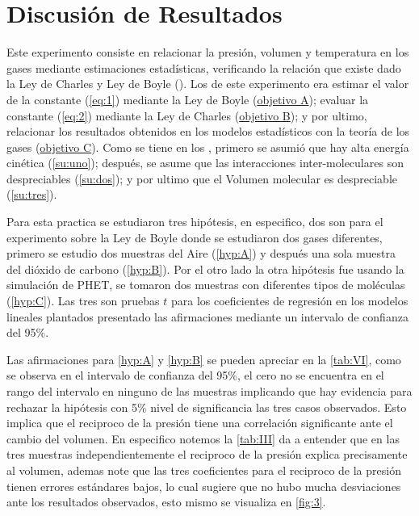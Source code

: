 \documentclass[12pt,a4paper]{config/myConfig}
\begin{document}
\section{Discusión de Resultados}
\label{sec:DISCUSSION}

Este experimento consiste en relacionar la presión, volumen y temperatura en los gases mediante estimaciones estadísticas, verificando la relación que existe dado la Ley de Charles y Ley de Boyle (\cite{physicsTextbook}).  Los de este experimento era estimar el valor de la constante (\cref{eq:1}) mediante la Ley de Boyle (\hyperref[obj:A]{objetivo A}); evaluar la constante (\cref{eq:2}) mediante la Ley de Charles (\hyperref[obj:B]{objetivo B}); y por ultimo, relacionar los resultados obtenidos en los modelos estadísticos con la teoría de los gases  (\hyperref[obj:C]{objetivo C}). Como se tiene en los , primero se asumió que hay alta energía cinética (\cref{su:uno}); después, se asume que las interacciones inter-moleculares son despreciables (\cref{su:dos}); y por ultimo que el Volumen molecular es despreciable (\cref{su:tres}).\newline 

Para esta practica se estudiaron tres hipótesis, en especifico, dos son para el experimento sobre la Ley de Boyle donde se estudiaron dos gases diferentes, primero se estudio dos muestras del Aire (\cref{hyp:A}) y después una sola muestra del dióxido de carbono (\cref{hyp:B}). Por el otro lado la otra hipótesis fue usando la simulación de PHET, se tomaron dos muestras con diferentes tipos de moléculas (\cref{hyp:C}). Las tres  son pruebas $t$ para los coeficientes de regresión en los modelos lineales plantados presentado las afirmaciones mediante un intervalo de confianza del 95\%. \newline    

Las afirmaciones para \cref{hyp:A} y \cref{hyp:B} se pueden apreciar en la \cref{tab:VI}, como se observa en el intervalo de confianza del 95\%, el cero no se encuentra en el rango del intervalo en ninguno de las muestras implicando que hay evidencia para rechazar la hipótesis con 5\% nivel de significancia las tres casos observados. Esto implica que el reciproco de la presión tiene una correlación significante ante el cambio del volumen. En especifico notemos la \cref{tab:III} da a entender que en las tres muestras independientemente el reciproco de la presión explica precisamente al volumen, ademas note que las tres coeficientes para el reciproco de la presión tienen errores estándares bajos, lo cual sugiere que no hubo mucha desviaciones ante los resultados observados, esto mismo se visualiza en \cref{fig:3}. \newline
\end{document}
